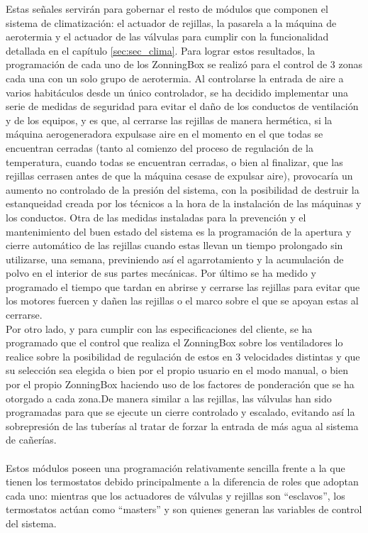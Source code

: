 Estas señales servirán para gobernar el resto de módulos que componen el sistema de climatización: el actuador de rejillas, la pasarela a la máquina de aerotermia y el actuador de las válvulas para cumplir con la funcionalidad detallada en el capítulo \ref{sec:sec_clima}.  Para lograr estos resultados, la programación de cada uno de los  ZonningBox se realizó para el control de 3 zonas cada una con un solo grupo de aerotermia. Al controlarse la entrada de aire a varios habitáculos desde un único controlador, se ha decidido implementar una serie de medidas de seguridad para evitar el daño de los conductos de ventilación y de los equipos, y es que, al cerrarse las rejillas de manera hermética, si la máquina aerogeneradora expulsase aire en el momento en el que todas se encuentran cerradas (tanto al comienzo del proceso de regulación de la temperatura, cuando todas se encuentran cerradas, o bien al finalizar, que las rejillas cerrasen antes de que la máquina cesase de expulsar aire), provocaría un aumento no controlado de la presión del sistema, con la posibilidad de destruir la estanqueidad creada por los técnicos a la hora de la instalación de las máquinas y los conductos. Otra de las medidas instaladas para la prevención y el mantenimiento del buen estado del sistema es la programación de la apertura y cierre automático de las rejillas cuando estas llevan un tiempo prolongado sin utilizarse, una semana, previniendo así el agarrotamiento y la acumulación de polvo en el interior de sus partes mecánicas. Por último se ha medido y programado el tiempo que tardan en abrirse y cerrarse las rejillas para evitar que los motores fuercen y dañen las rejillas o el marco sobre el que se apoyan estas al cerrarse.\\
Por otro lado, y para cumplir con las especificaciones del cliente, se ha programado que el control que realiza el ZonningBox sobre los ventiladores lo realice sobre la posibilidad de regulación de estos en 3 velocidades distintas y que su selección sea elegida o bien por el propio usuario en el modo manual, o bien por el propio ZonningBox haciendo uso de los factores de ponderación que se ha otorgado a cada zona.De manera similar a las rejillas, las válvulas han sido programadas para que se ejecute un cierre controlado y escalado, evitando así la sobrepresión de las tuberías al tratar de forzar la entrada de más agua al sistema de cañerías.\\\\
Estos módulos poseen una programación relativamente sencilla frente a la que tienen los termostatos debido principalmente a la diferencia de roles que adoptan cada uno: mientras que los actuadores de válvulas y rejillas son “esclavos”, los termostatos actúan como “masters” y son quienes generan las variables de control del sistema.\\
